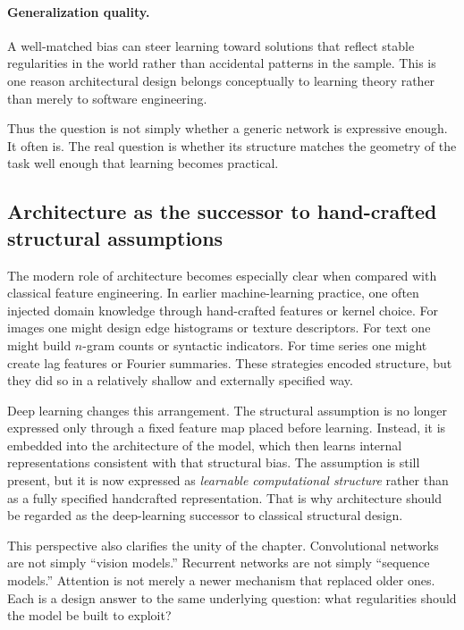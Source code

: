 \paragraph{Generalization quality.}
A well-matched bias can steer learning toward solutions that reflect stable regularities in the world rather than accidental patterns in the sample.
This is one reason architectural design belongs conceptually to learning theory rather than merely to software engineering.

\medskip

Thus the question is not simply whether a generic network is expressive enough.
It often is.
The real question is whether its structure matches the geometry of the task well enough that learning becomes practical.

\subsection*{Architecture as the successor to hand-crafted structural assumptions}

The modern role of architecture becomes especially clear when compared with classical feature engineering.
In earlier machine-learning practice, one often injected domain knowledge through hand-crafted features or kernel choice.
For images one might design edge histograms or texture descriptors.
For text one might build $n$-gram counts or syntactic indicators.
For time series one might create lag features or Fourier summaries.
These strategies encoded structure, but they did so in a relatively shallow and externally specified way.

\medskip

Deep learning changes this arrangement.
The structural assumption is no longer expressed only through a fixed feature map placed before learning.
Instead, it is embedded into the architecture of the model, which then learns internal representations consistent with that structural bias.
The assumption is still present, but it is now expressed as \emph{learnable computational structure} rather than as a fully specified handcrafted representation.
That is why architecture should be regarded as the deep-learning successor to classical structural design.

\medskip

This perspective also clarifies the unity of the chapter.
Convolutional networks are not simply ``vision models.''
Recurrent networks are not simply ``sequence models.''
Attention is not merely a newer mechanism that replaced older ones.
Each is a design answer to the same underlying question:
what regularities should the model be built to exploit?


